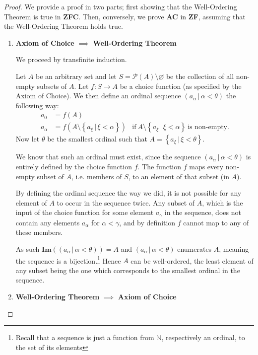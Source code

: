 \documentclass[../../main.tex]{subfiles}
\begin{document}
\begin{proof}\cite[Theorem 15, p.39]{Jec78}
    We provide a proof in two parts; first showing that the Well-Ordering Theorem is true in \textbf{ZFC}.
    Then, conversely, we prove \textbf{AC} in \textbf{ZF}, assuming that the Well-Ordering Theorem holds true.
    \begin{enumerate}
        \item \textbf{Axiom of Choice} $\implies$ \textbf{Well-Ordering Theorem}
        
        We proceed by transfinite induction.

        Let $A$ be an arbitrary set and let $S = \mathcal{P}(A) \setminus \varnothing$ be the collection of all non-empty subsets of $A$.
        Let $f: S \to A$ be a choice function (as specified by the Axiom of Choice).
        We then define an ordinal sequence $\left(a_{\alpha} \, \vert \, \alpha < \theta \right)$ the following way:
        \begin{align*}
            a_0 &= f(A)\\
            a_{\alpha} &= f\left(A \setminus \left\{a_\xi \, \vert \, \xi < \alpha\right\} \right)
            &\text{if}\ A \setminus \left\{a_\xi \, \vert \, \xi < \alpha\right\}\ \text{is non-empty}.
        \end{align*}
        Now let $\theta$ be the smallest ordinal such that $A = \left\{a_\xi \, \vert \, \xi < \theta\right\}$.
        
        We know that such an ordinal must exist, since the sequence $\left(a_{\alpha} \, \vert \, \alpha < \theta \right)$ is entirely defined by the choice function $f$.
        The function $f$ maps every non-empty subset of $A$, i.e. members of $S$, to an element of that subset (in $A$).
        
        By defining the ordinal sequence the way we did, it is not possible for any element of $A$ to occur in the sequence twice.
        Any subset of $A$, which is the input of the choice function for some element $a_\gamma$ in the sequence, does not contain any elements $a_\alpha$ for $\alpha < \gamma$, and by definition $f$ cannot map to any of these members.
        
        As such $\mathbf{Im}\left(\left(a_{\alpha} \, \vert \, \alpha < \theta \right)\right) = A$
        and $\left(a_{\alpha} \, \vert \, \alpha < \theta \right)$ enumerates $A$, meaning the sequence is a bijection.\footnote{Recall that a sequence is just a function from $\mathbb{N}$, respectively an ordinal, to the set of its elements}
        Hence $A$ can be well-ordered, the least element of any subset being the one which corresponds to the smallest ordinal in the sequence.
        \item \textbf{Well-Ordering Theorem} $\implies$ \textbf{Axiom of Choice}
        

\end{enumerate}
\end{proof}
\end{document}
